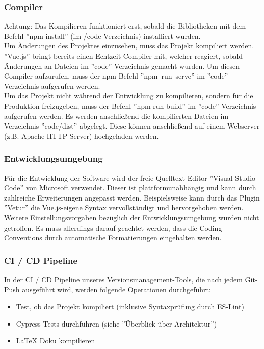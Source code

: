 \documentclass[twoside]{report}
\begin{document}
\subsubsection{Compiler}
Achtung: Das Kompilieren funktioniert erst, sobald die Bibliotheken mit dem Befehl
''npm install'' (im /code Verzeichnis) installiert wurden.
\\
Um Änderungen des Projektes einzusehen, muss das Projekt kompiliert werden.
''Vue.js'' bringt bereits einen Echtzeit-Compiler mit, welcher reagiert, sobald Änderungen
an Dateien im ''code'' Verzeichnis gemacht wurden. Um diesen Compiler aufzurufen, muss der npm-Befehl \mbox{''npm run serve''} im ''code'' Verzeichnis
aufgerufen werden.
\\Um das Projekt nicht während der Entwicklung zu kompilieren, sondern für die Produktion freizugeben,
muss der Befehl ''npm run build'' im ''code'' Verzeichnis aufgerufen werden. Es werden
anschließend die kompilierten Dateien im Verzeichnis ''code/dist'' abgelegt.
Diese können anschließend auf einem Webserver (z.B. Apache HTTP Server) hochgeladen werden.

\subsubsection{Entwicklungsumgebung}
Für die Entwicklung der Software wird der freie Quelltext-Editor ''Visual Studio Code''
von Microsoft verwendet. Dieser ist plattformunabhängig und kann durch zahlreiche Erweiterungen
angepasst werden. Beispielsweise kann durch das Plugin ''Vetur'' die Vue.js-eigene Syntax
vervollständigt und hervorgehoben werden.
\\Weitere Einstellungsvorgaben bezüglich der Entwicklungsumgebung wurden nicht getroffen.
Es muss allerdings darauf geachtet werden, dass die Coding-Conventions durch automatische
Formatierungen eingehalten werden.

\subsubsection{CI / CD Pipeline}
In der CI / CD Pipeline unseres Versionsmanagement-Tools, die nach jedem Git-Push
ausgeführt wird, werden folgende Operationen durchgeführt:
\begin{itemize}
  \item Test, ob das Projekt kompiliert (inklusive Syntaxprüfung durch ES-Lint)
  \item Cypress Tests durchführen (siehe ''Überblick über Architektur'')
  \item LaTeX Doku kompilieren
\end{itemize}
\end{document}
